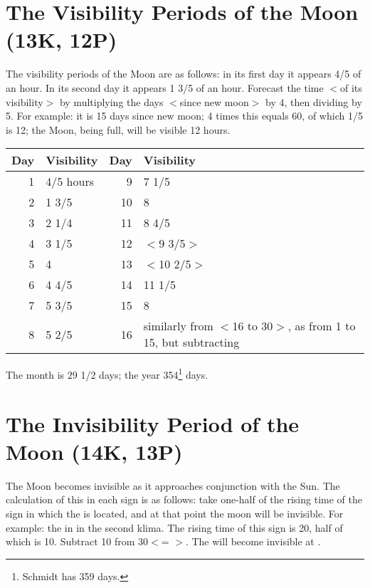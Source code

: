\section{The Visibility Periods of the Moon (13K, 12P)}

The visibility periods of the Moon are as follows: in its first day it appears 4/5 of an hour. In its second day it appears 1 3/5 of an hour. Forecast the time $<$of its visibility$>$ by multiplying the days $<$since new moon$>$ by 4, then dividing by 5. For example: it is 15 days since new moon; 4 times this equals 60, of which 1/5 is 12; the Moon, being full, will be visible 12 hours.

\begin{table}[ht]
\begin{center}
\begin{tabularx}{\textwidth}	{| r | l | r | X |}
\hline
Day & Visibility & Day & Visibility \\
\hline
1	& 4/5 hours	& 9		& 7 1/5	\\
2	& 1 3/5	  	& 10	& 8			\\	
3	& 2 1/4		& 11	& 8 4/5	\\
4	& 3 1/5		& 12	& $<$9 3/5$>$	\\
5	& 4				& 13	& $<$10 2/5$>$ \\
6	& 4 4/5		& 14	& 11 1/5	\\
7	& 5 3/5		& 15 	& 8			\\
8	& 5 2/5		& 16	& similarly from $<$16 to 30$>$, as
							  from 1 to 15, but subtracting \\				\hline
\end{tabularx}
\end{center}
\end{table}

The month is 29 1/2 days; the year 354\footnote{Schmidt has 359 days.} days.

\newpage
\section{The Invisibility Period of the Moon (14K, 13P)}

The Moon becomes invisible as it approaches conjunction with the Sun. The calculation of this in each sign is as follows: take one-half of the rising time of the sign in which the \Sun\xspace is located, and at that point the moon will be invisible. For example: the \Sun\xspace in \Aries\xspace in the second klima. The rising time of this sign is 20, half of which is 10. Subtract 10 from 30\deg\xspace $<$\Aries\xspace 1\deg\xspace = \Pisces\xspace 30\deg$>$. The \Moon\xspace will become invisible at \Pisces\xspace 20\deg.

